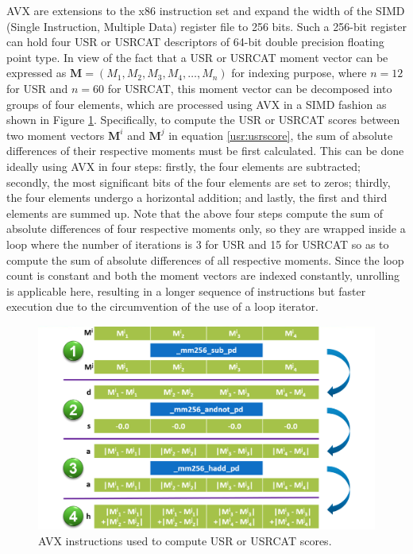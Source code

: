 AVX are extensions to the x86 instruction set and expand the width of the SIMD (Single Instruction, Multiple Data) register file to 256 bits. Such a 256-bit register can hold four USR or USRCAT descriptors of 64-bit double precision floating point type. In view of the fact that a USR or USRCAT moment vector can be expressed as $\mathbf M=(M_1, M_2, M_3, M_4, \ldots, M_n)$ for indexing purpose, where $n=12$ for USR and $n=60$ for USRCAT, this moment vector can be decomposed into groups of four elements, which are processed using AVX in a SIMD fashion as shown in Figure \ref{usr:AVX}. Specifically, to compute the USR or USRCAT scores between two moment vectors $\mathbf M^i$ and $\mathbf M^j$ in equation \eqref{usr:usrscore}, the sum of absolute differences of their respective moments must be first calculated. This can be done ideally using AVX in four steps: firstly, the four elements are subtracted; secondly, the most significant bits of the four elements are set to zeros; thirdly, the four elements undergo a horizontal addition; and lastly, the first and third elements are summed up. Note that the above four steps compute the sum of absolute differences of four respective moments only, so they are wrapped inside a loop where the number of iterations is 3 for USR and 15 for USRCAT so as to compute the sum of absolute differences of all respective moments. Since the loop count is constant and both the moment vectors are indexed constantly, unrolling is applicable here, resulting in a longer sequence of instructions but faster execution due to the circumvention of the use of a loop iterator.

\begin{figure}
\begin{center}
\includegraphics[width=\linewidth]{../usr/AVX.png}
\end{center}
\caption{AVX instructions used to compute USR or USRCAT scores.}
\label{usr:AVX}
\end{figure}

